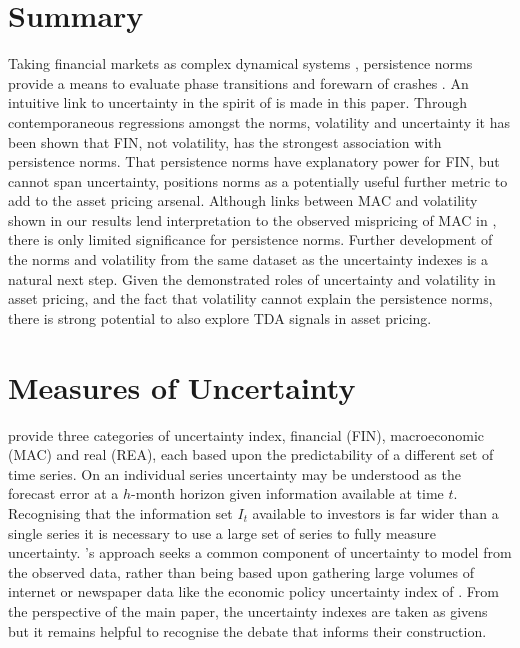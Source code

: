 \documentclass{article}
\begin{document}
\section{Summary}

Taking financial markets as complex dynamical systems \citep{hsieh1991chaos}, persistence norms provide a means to evaluate phase transitions and forewarn of crashes \citep{gidea2018topological}. An intuitive link to uncertainty in the spirit of \cite{jurado2015measuring} is made in this paper. Through contemporaneous regressions amongst the norms, volatility and uncertainty it has been shown that FIN, not volatility, has the strongest association with persistence norms. That persistence norms have explanatory power for FIN, but cannot span uncertainty, positions norms as a potentially useful further metric to add to the asset pricing arsenal. Although links between MAC and volatility shown in our results lend interpretation to the observed mispricing of MAC in \cite{bali2017economic}, there is only limited significance for persistence norms. Further development of the norms and volatility from the same dataset as the uncertainty indexes is a natural next step. Given the demonstrated roles of uncertainty and volatility in asset pricing, and the fact that volatility cannot explain the persistence norms, there is strong potential to also explore TDA signals in asset pricing.




\appendix

\setcounter{figure}{0}
\renewcommand{\thefigure}{A\arabic{figure}}
\setcounter{table}{0}
\renewcommand{\thetable}{A\arabic{table}}

\section{Measures of Uncertainty}

\cite{jurado2015measuring} provide three categories of uncertainty index, financial (FIN), macroeconomic (MAC) and real (REA), each based upon the predictability of a different set of time series. On an individual series uncertainty may be understood as the forecast error at a $h$-month horizon given information available at time $t$. Recognising that the information set $I_t$ available to investors is far wider than a single series it is necessary to use a large set of series to fully measure uncertainty. \cite{jurado2015measuring}'s approach seeks a common component of uncertainty to model from the observed data, rather than being based upon gathering large volumes of internet or newspaper data like the economic policy uncertainty index of \cite{baker2016measuring}. From the perspective of the main paper, the uncertainty indexes are taken as givens but it remains helpful to recognise the debate that informs their construction.
\end{document}
